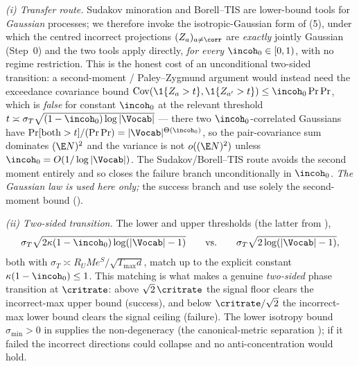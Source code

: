 \begin{remark}
\label{rem:anti_concentration_matching}
\emph{(i) Transfer route.} Sudakov minoration and Borell--TIS are
lower-bound tools for \emph{Gaussian} processes; we therefore invoke the
isotropic-Gaussian form  of
(5), under which the centred incorrect
projections $(Z_a)_{a\neq\corr}$ are \emph{exactly} jointly Gaussian
(Step~0) and the two tools apply directly, \emph{for every}
$\incoh_0\in[0,1)$, with no regime restriction. This is the honest cost of
an unconditional two-sided transition: a second-moment / Paley--Zygmund
argument would instead need the exceedance covariance bound
$\operatorname{Cov}(\1\{Z_a>t\},\1\{Z_{a'}>t\})\le\incoh_0\Pr\Pr$, which is
\emph{false} for constant $\incoh_0$ at the relevant threshold
$t\asymp\sigma_T\sqrt{(1-\incoh_0)\log|\Vocab|}$ --- there two
$\incoh_0$-correlated Gaussians have
$\Pr[\text{both}>t]/(\Pr\Pr)=|\Vocab|^{\Theta(\incoh_0)}$, so the
pair-covariance sum dominates $(\E N)^2$ and the variance is not
$o((\E N)^2)$ unless $\incoh_0=O(1/\log|\Vocab|)$. The Sudakov/Borell--TIS
route avoids the second moment entirely and so closes the failure branch
unconditionally in $\incoh_0$. \emph{The Gaussian law is used here only;}
the success branch and  use solely the second-moment bound
 ().

\smallskip
\emph{(ii) Two-sided transition.} The lower and upper thresholds (the
latter from ),
\begin{align*}
   \sigma_T\sqrt{2\kappa(1-\incoh_0)\log(|\Vocab|-1)}
   \qquad\text{vs.}\qquad
   \sigma_T\sqrt{2\log(|\Vocab|-1)},
\end{align*}
both with $\sigma_T\asymp R_U M e^S/\sqrt{T_{\max}d}$, match up to the
explicit constant $\kappa(1-\incoh_0)\le1$. This matching is what makes
 a genuine \emph{two-sided} phase transition at $\critrate$:
above $\sqrt2\,\critrate$ the signal floor clears the incorrect-max upper
bound (success), and below $\critrate/\sqrt2$ the incorrect-max lower bound
clears the signal ceiling (failure). The lower isotropy bound
$\sigma_{\min}>0$ in  supplies the non-degeneracy
(the canonical-metric separation ); if it failed the
incorrect directions could collapse and no anti-concentration would hold.
\end{remark}
